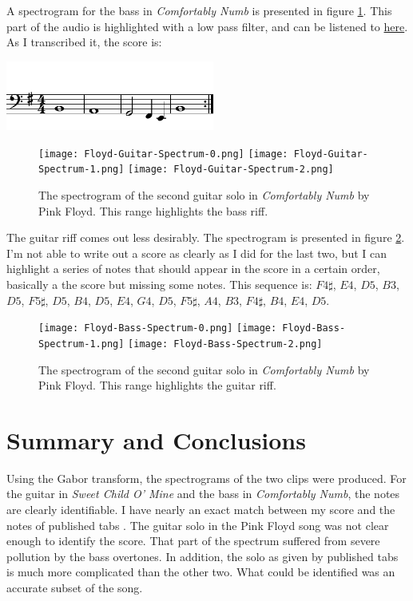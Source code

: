 \documentclass{article}
\begin{document}
    A spectrogram for the bass in \textit{Comfortably Numb} is presented in figure \ref{fig:Floyd-Bass}. This part of the audio is highlighted with a low pass filter, and can be listened to \href{https://github.com/bagriffith/AMATH582/blob/main/HW2/output/Floyd-Bass.wav}{here}. As I transcribed it, the score is:
    
    \begin{center}
        \includegraphics[width=2.7in]{Floyd-Bass-score.pdf}
    \end{center}

    \begin{figure}
        \centering
        \texttt{[image: Floyd-Guitar-Spectrum-0.png]}
        \texttt{[image: Floyd-Guitar-Spectrum-1.png]}
        \texttt{[image: Floyd-Guitar-Spectrum-2.png]}
        \caption{The spectrogram of the second guitar solo in \textit{Comfortably Numb} by Pink Floyd. This range highlights the bass riff.}
        \label{fig:Floyd-Bass}
    \end{figure}

    The guitar riff comes out less desirably. The spectrogram is presented in figure \ref{fig:Floyd-Guitar}. I'm not able to write out a score as clearly as I did for the last two, but I can highlight a series of notes that should appear in the score in a certain order, basically a the score but missing some notes. This sequence is: $F4\sharp$, $E4$, $D5$, $B3$, $D5$, $F5\sharp$, $D5$, $B4$, $D5$, $E4$, $G4$, $D5$, $F5\sharp$, $A4$, $B3$, $F4\sharp$, $B4$, $E4$, $D5$.

    \begin{figure}[p]
        \centering
        \texttt{[image: Floyd-Bass-Spectrum-0.png]}
        \texttt{[image: Floyd-Bass-Spectrum-1.png]}
        \texttt{[image: Floyd-Bass-Spectrum-2.png]}
        \caption{The spectrogram of the second guitar solo in \textit{Comfortably Numb} by Pink Floyd. This range highlights the guitar riff.}
        \label{fig:Floyd-Guitar}
    \end{figure}
    
    \section{Summary and Conclusions}
    Using the Gabor transform, the spectrograms of the two clips were produced. For the guitar in \textit{Sweet Child O' Mine} and the bass in \textit{Comfortably Numb}, the notes are clearly identifiable. I have nearly an exact match between my score and the notes of published tabs \cite{GNR} \cite{Floyd}. The guitar solo in the Pink Floyd song was not clear enough to identify the score. That part of the spectrum suffered from severe pollution by the bass overtones. In addition, the solo as given by published tabs is much more complicated than the other two. What could be identified was an accurate subset of the song.
\end{document}
